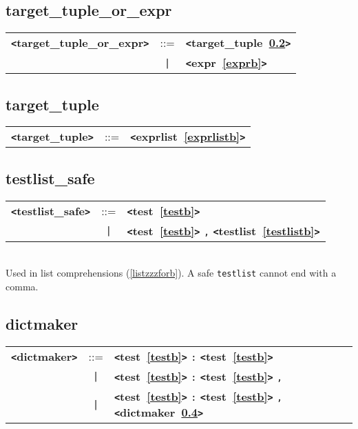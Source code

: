 \documentclass[12pt]{article}
\begin{document}
\subsection{target\_tuple\_or\_expr}
\label{targetzzztuplezzzorzzzexprb}
\begin{tabular}{lcl}
{\bf \verb+<+target\_tuple\_or\_expr\verb+>+} & ::=  & {\bf \verb+<+target\_tuple~\ref{targetzzztupleb}\verb+>+}  \\
 & \verb+|+  & {\bf \verb+<+expr~\ref{exprb}\verb+>+}  \\
\end{tabular}

\subsection{target\_tuple}
\label{targetzzztupleb}
\begin{tabular}{lcl}
{\bf \verb+<+target\_tuple\verb+>+} & ::=  & {\bf \verb+<+exprlist~\ref{exprlistb}\verb+>+}  \\
\end{tabular}

\subsection{testlist\_safe}
\label{testlistzzzsafeb}
\begin{tabular}{lcl}
{\bf \verb+<+testlist\_safe\verb+>+} & ::=  & {\bf \verb+<+test~\ref{testb}\verb+>+}  \\
 & \verb+|+  & {\bf \verb+<+test~\ref{testb}\verb+>+}  \verb|,| {\bf \verb+<+testlist~\ref{testlistb}\verb+>+}  \\
\end{tabular} \\

Used in list comprehensions (\ref{listzzzforb}).  A safe \verb|testlist| cannot end with a comma.

\subsection{dictmaker}
\label{dictmakerb}
\begin{tabular}{lcl}
{\bf \verb+<+dictmaker\verb+>+} & ::=  & {\bf \verb+<+test~\ref{testb}\verb+>+}  \verb|:| {\bf \verb+<+test~\ref{testb}\verb+>+}  \\
 & \verb+|+  & {\bf \verb+<+test~\ref{testb}\verb+>+}  \verb|:| {\bf \verb+<+test~\ref{testb}\verb+>+}  \verb|,| \\
 & \verb+|+  & {\bf \verb+<+test~\ref{testb}\verb+>+}  \verb|:| {\bf \verb+<+test~\ref{testb}\verb+>+}  \verb|,| {\bf \verb+<+dictmaker~\ref{dictmakerb}\verb+>+}  \\
\end{tabular}
\end{document}
